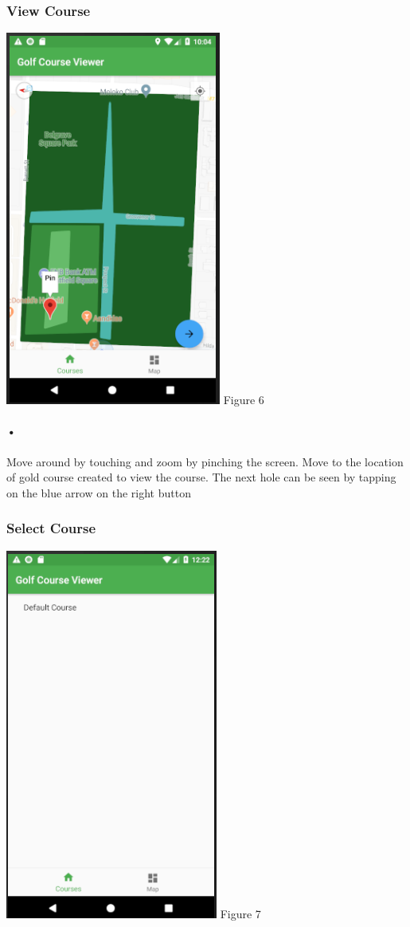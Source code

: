 \documentclass{article}
\begin{document}
	\subsubsection{View Course}
	    \includegraphics[scale=0.8]{coursemap.png}
	    Figure 6
	
	\paragraph{•}
	Move around by touching and zoom by pinching the screen. Move to the location of gold course created to view the course. The next hole can be seen by tapping on the blue arrow on the right button
	
	\subsubsection{Select Course}
	\includegraphics[scale=0.7]{CourseListUI.PNG}
	\linebreak
	Figure 7
	
\end{document}
